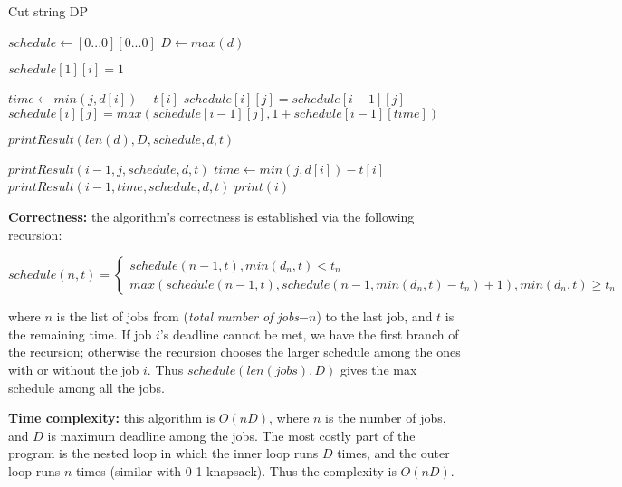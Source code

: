 \documentclass{article}
\begin{document}
\begin{description}
  \begin{algorithm}[H]
  \caption{Cut string DP}
  \label{alg:job-scheduling-dp}
    \begin{algorithmic}[1]

      \State $schedule \gets [0...0][0...0]$
      \State $D \gets max(d)$

        \State $schedule[1][i] = 1$
      \EndFor

          \State $time \gets min(j, d[i]) - t[i]$
            \State $schedule[i][j] = schedule[i-1][j]$
          \Else
            \State $schedule[i][j] = max(schedule[i-1][j], 1 + schedule[i-1][time])$
          \EndIf
        \EndFor
      \EndFor

      \State $printResult(len(d), D, schedule, d, t)$
      \State {}
    \EndFunction

        \State \Return {}
      \EndIf

        \State $printResult(i-1, j, schedule, d, t)$
      \Else
        \State $time \gets min(j, d[i]) - t[i]$
        \State $printResult(i-1, time, schedule, d, t)$
        \State $print(i)$
      \EndIf
    \EndFunction

    \end{algorithmic}
  \end{algorithm}

  \textbf{Correctness:} the algorithm's correctness is established via the following recursion:

\[
  schedule(n,t) = \begin{cases}
                    schedule(n-1, t), min(d_n, t) < t_n \\
                    max(schedule(n-1, t), schedule(n-1, min(d_n, t) - t_n) + 1), min(d_n, t) \geq t_n
                  \end{cases}
\]

  where $n$ is the list of jobs from (\textit{total number of jobs}$ - n$) to the last job, and $t$ is the remaining time. If job $i$'s deadline cannot be met, we have the first branch of the recursion; otherwise the recursion chooses the larger schedule among the ones with or without the job $i$. Thus $schedule(len(jobs), D)$ gives the max schedule among all the jobs.
  
  \textbf{Time complexity:} this algorithm is $O(nD)$, where $n$ is the number of jobs, and $D$ is maximum deadline among the jobs. The most costly part of the program is the nested loop in which the inner loop runs $D$ times, and the outer loop runs $n$ times (similar with 0-1 knapsack). Thus the complexity is $O(nD)$.

\end{description}
\end{document}
